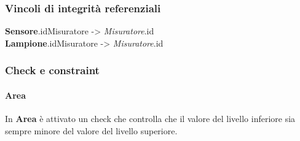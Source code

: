 \subsubsection{Vincoli di integrità referenziali}

\textbf{Sensore}.idMisuratore -> \textit{Misuratore}.id \\
\textbf{Lampione}.idMisuratore -> \textit{Misuratore}.id

\subsubsection{Check e constraint}

\paragraph{Area} In \textbf{Area} è attivato un check che controlla che il valore del livello inferiore sia sempre minore del valore del livello superiore.